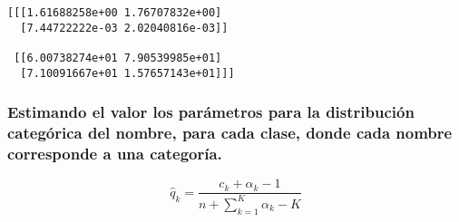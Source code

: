 \documentclass[11pt]{article}
\begin{document}
    \begin{Verbatim}[commandchars=\\\{\}]
[[[1.61688258e+00 1.76707832e+00]
  [7.44722222e-03 2.02040816e-03]]

 [[6.00738274e+01 7.90539985e+01]
  [7.10091667e+01 1.57657143e+01]]]
    \end{Verbatim}

    \hypertarget{estimando-el-valor-los-paruxe1metros-para-la-distribuciuxf3n-categuxf3rica-del-nombre-para-cada-clase-donde-cada-nombre-corresponde-a-una-categoruxeda.}{%
\subsubsection{Estimando el valor los parámetros para la distribución
categórica del nombre, para cada clase, donde cada nombre corresponde a
una
categoría.}\label{estimando-el-valor-los-paruxe1metros-para-la-distribuciuxf3n-categuxf3rica-del-nombre-para-cada-clase-donde-cada-nombre-corresponde-a-una-categoruxeda.}}

\[ \hat{q}_k = \frac{c_k + \alpha_k - 1}{n + \sum_{k = 1}^K \alpha_k - K}\]
\end{document}
